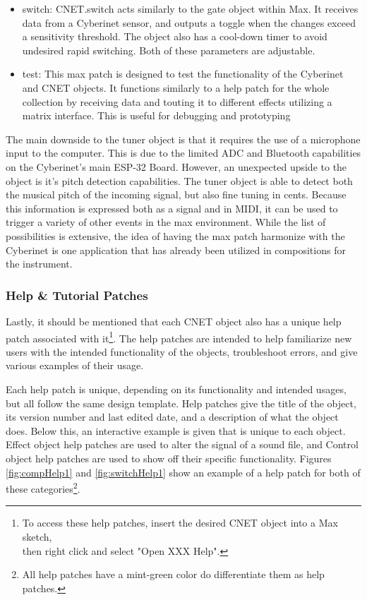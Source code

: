 \begin{itemize}
    \item switch: CNET.switch acts similarly to the gate object within Max. It receives data from a Cyberinet sensor, and outputs a toggle when the changes exceed a sensitivity threshold. The object also has a cool-down timer to avoid undesired rapid switching. Both of these parameters are adjustable.
    \item test: This max patch is designed to test the functionality of the Cyberinet and CNET objects. It functions similarly to a help patch for the whole collection by receiving data and touting it to different effects utilizing a matrix interface. This is useful for debugging and prototyping
\end{itemize}


The main downside to the tuner object is that it requires the use of a microphone input to the computer. This is due to the limited ADC and Bluetooth capabilities on the Cyberinet's main ESP-32 Board. However, an unexpected upside to the object is it's pitch detection capabilities. The tuner object is able to detect both the musical pitch of the incoming signal, but also fine tuning in cents. Because this information is expressed both as a signal and in MIDI, it can be used to trigger a variety of other events in the max environment. While the list of possibilities is extensive, the idea of having the max patch harmonize with the Cyberinet is one application that has already been utilized in compositions for the instrument.

\subsubsection{Help \& Tutorial Patches}

Lastly, it should be mentioned that each CNET object also has a unique help patch associated with it\footnote{To access these help patches, insert the desired CNET object into a Max sketch, \\ then right click and select "Open XXX Help".}. The help patches are intended to help familiarize new users with the intended functionality of the objects, troubleshoot errors, and give various examples of their usage.

Each help patch is unique, depending on its functionality and intended usages, but all follow the same design template. Help patches give the title of the object, its version number and last edited date, and a description of what the object does. Below this, an interactive example is given that is unique to each object. Effect object help patches are used to alter the signal of a sound file, and Control object help patches are used to show off their specific functionality. Figures \ref{fig:compHelp1} and \ref{fig:switchHelp1} show an example of a help patch for both of these categories\footnote{All help patches have a mint-green color do differentiate them as help patches.}.

